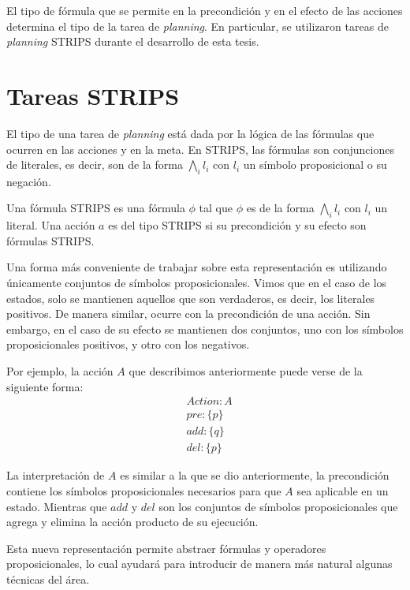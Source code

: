 El tipo de fórmula que se permite en la precondición y en el efecto de las
acciones determina el tipo de la tarea de \emph{planning}. En particular, se
utilizaron tareas de \emph{planning} STRIPS durante el desarrollo de esta tesis.

\section{Tareas STRIPS}

El tipo de una tarea de \emph{planning} está dada por la lógica de las fórmulas
que ocurren en las acciones y en la meta. En STRIPS, las fórmulas son conjunciones de literales, es decir, son de la forma $\bigwedge_i l_i$ con $l_i$
un símbolo proposicional o su negación.

\begin{mydef}
    Una fórmula STRIPS es una fórmula $\phi$ tal que $\phi$ es de la forma $\bigwedge_i l_i$ con $l_i$ un literal.
    Una acción $a$ es del tipo STRIPS si su precondición y su efecto son fórmulas
    STRIPS.
\end{mydef}

Una forma más conveniente de trabajar sobre esta representación es utilizando
únicamente conjuntos de símbolos proposicionales. Vimos que en el caso de los
estados, solo se mantienen aquellos que son verdaderos, es decir, los
literales positivos. De manera similar, ocurre con la precondición de una
acción. Sin embargo, en el caso de su efecto se mantienen dos conjuntos, uno
con los símbolos proposicionales positivos, y otro con los negativos.

Por ejemplo, la acción $A$ que describimos anteriormente puede verse
de la siguiente forma:
\begin{align*}
    & Action : A \\
    & pre : \{ p \}\\
    & add : \{ q \}\\
    & del : \{ p \}
\end{align*}

La interpretación de $A$ es similar a la que se dio anteriormente, la
precondición contiene los símbolos proposicionales necesarios para que $A$ sea
aplicable en un estado. Mientras que $add$ y $del$ son los conjuntos de símbolos
proposicionales que agrega y elimina la acción producto de su ejecución.

Esta nueva representación permite abstraer fórmulas y operadores
proposicionales, lo cual ayudará para introducir de manera más natural algunas
técnicas del área.

